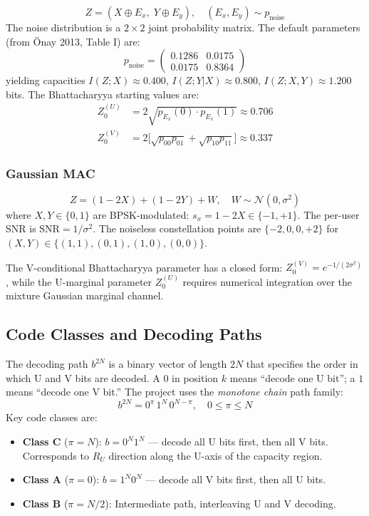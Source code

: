 \documentclass[11pt,a4paper]{article}
\begin{document}
\begin{equation}
  Z = (X \oplus E_x, \; Y \oplus E_y), \quad (E_x, E_y) \sim p_{\text{noise}}
\end{equation}
The noise distribution is a $2 \times 2$ joint probability matrix. The
default parameters (from \"{O}nay 2013, Table I) are:
\[
  p_{\text{noise}} = \begin{pmatrix} 0.1286 & 0.0175 \\ 0.0175 & 0.8364 \end{pmatrix}
\]
yielding capacities $I(Z;X) \approx 0.400$, $I(Z;Y|X) \approx 0.800$,
$I(Z;X,Y) \approx 1.200$ bits. The Bhattacharyya starting values are:
\begin{align}
  Z_0^{(U)} &= 2\sqrt{p_{E_x}(0) \cdot p_{E_x}(1)} \approx 0.706 \\
  Z_0^{(V)} &= 2\bigl[\sqrt{p_{00} p_{01}} + \sqrt{p_{10} p_{11}}\bigr] \approx 0.337
\end{align}

\subsubsection{Gaussian MAC}

\begin{equation}
  Z = (1 - 2X) + (1 - 2Y) + W, \quad W \sim \mathcal{N}(0, \sigma^2)
\end{equation}
where $X, Y \in \{0,1\}$ are BPSK-modulated: $s_x = 1 - 2X \in \{-1, +1\}$.
The per-user SNR is $\text{SNR} = 1/\sigma^2$. The noiseless constellation
points are $\{-2, 0, 0, +2\}$ for $(X,Y) \in \{(1,1), (0,1), (1,0), (0,0)\}$.

The V-conditional Bhattacharyya parameter has a closed form:
$Z_0^{(V)} = e^{-1/(2\sigma^2)}$, while the U-marginal parameter
$Z_0^{(U)}$ requires numerical integration over the mixture Gaussian
marginal channel.

\subsection{Code Classes and Decoding Paths}

The decoding path $b^{2N}$ is a binary vector of length $2N$ that specifies
the order in which U and V bits are decoded. A $0$ in position $k$ means
``decode one U bit''; a $1$ means ``decode one V bit.'' The project uses
the \emph{monotone chain} path family:
\begin{equation}
  b^{2N} = 0^{\pi} \, 1^N \, 0^{N - \pi}, \quad 0 \leq \pi \leq N
\end{equation}
Key code classes are:
\begin{itemize}
  \item \textbf{Class C} ($\pi = N$): $b = 0^N 1^N$ --- decode all U bits first, then all V bits. Corresponds to $R_U$ direction along the U-axis of the capacity region.
  \item \textbf{Class A} ($\pi = 0$): $b = 1^N 0^N$ --- decode all V bits first, then all U bits.
  \item \textbf{Class B} ($\pi = N/2$): Intermediate path, interleaving U and V decoding.
\end{itemize}
\end{document}
